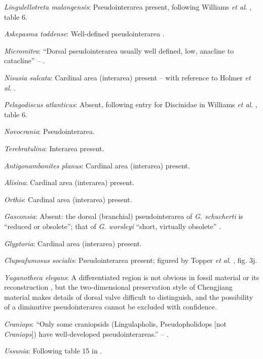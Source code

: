 \documentclass[]{book}
\theoremstyle{definition}
\theoremstyle{definition}
\theoremstyle{definition}
\theoremstyle{remark}
\begin{document}
\emph{Lingulellotreta malongensis}: Pseudointerarea present, following
Williams \emph{et al}.
\citeyearpar{Williams2000BrachiopodaLinguliformea}, table 6.

\emph{Askepasma toddense}: Well-defined pseudointerarea
\citep[p153]{Williams2000BrachiopodaLinguliformea}.

\emph{Micromitra}: ``Dorsal pseudointerarea usually well defined, low,
anacline to catacline'' -- \citet{Williams2000BrachiopodaLinguliformea}.

\emph{Nisusia sulcata}: Cardinal area (interarea) present -- with
reference to Holmer \emph{et al}.
\citeyearpar{Holmer2018Evolutionarysignificance}.

\emph{Pelagodiscus atlanticus}: Absent, following entry for Discinidae
in Williams \emph{et al}.
\citeyearpar{Williams2000BrachiopodaLinguliformea}, table 6.

\emph{Novocrania}: Pseudointerarea.

\emph{Terebratulina}: Interarea present.

\emph{Antigonambonites planus}: Cardinal area (interarea) present.

\emph{Alisina}: Cardinal area (interarea) present.

\emph{Orthis}: Cardinal area (interarea) present.

\emph{Gasconsia}: Absent: the dorsal (branchial) pseudointerarea of
\emph{G. schucherti} is ``reduced or obsolete''; that of \emph{G.
worsleyi} ``short, virtually obsolete'' \citep{Hanken1985Thetaxonomy}.

\emph{Glyptoria}: Cardinal area (interarea) present.

\emph{Clupeafumosus socialis}: Pseudointerarea present; figured by
Topper \emph{et al}. \citeyearpar{Topper2013Reappraisalof}, fig. 3j.

\emph{Yuganotheca elegans}: A differentiated region is not obvious in
fossil material or its reconstruction \citep{Zhang2014Anearly}, but the
two-dimensional preservation style of Chengjiang material makes details
of dorsal valve difficult to distinguish, and the possibility of a
diminutive pseudointerarea cannot be excluded with confidence.

\emph{Craniops}: ``Only some craniopsids (Lingulapholis, Pseudopholidops
{[}not \emph{Craniops}{]}) have well-developed pseudointerareas.'' --
\citet{Williams2000BrachiopodaLinguliformea}.

\emph{Ussunia}: Following table 15 in
\citet{Williams2000BrachiopodaLinguliformea}.
\end{document}
